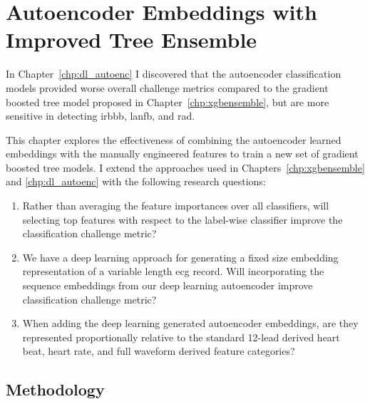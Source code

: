 \documentclass[\main/thesis.tex]{subfiles}
\begin{document}
\chapter{Autoencoder Embeddings with Improved Tree Ensemble}
\label{chp:aencxgb}

In Chapter~\ref{chp:dl_autoenc} I discovered that the autoencoder classification models provided worse overall challenge metrics compared to the gradient boosted tree model proposed in Chapter~\ref{chp:xgbensemble}, but are more sensitive in detecting \gls{irbbb}, \gls{lanfb}, and \gls{rad}.

This chapter explores the effectiveness of combining the autoencoder learned embeddings with the manually engineered features to train a new set of gradient boosted tree models.
I extend the approaches used in Chapters~\ref{chp:xgbensemble} and \ref{chp:dl_autoenc} with the following research questions:
\begin{enumerate}
    \item \label{question:xgb_aenc_avg_vs_lab} Rather than averaging the feature importances over all classifiers, will selecting top features with respect to the label-wise classifier improve the classification challenge metric?
    \item \label{question:xgb_aenc_embd_vs_no_embd} We have a deep learning approach for generating a fixed size embedding representation of a variable length \gls{ecg} record. Will incorporating the sequence embeddings from our deep learning autoencoder improve classification challenge metric?
    \item \label{question:xgb_aenc_embd_ratio} When adding the deep learning generated autoencoder embeddings, are they represented proportionally relative to the standard 12-lead derived heart beat, heart rate, and full waveform derived feature categories?
\end{enumerate}

\section{Methodology}
\end{document}
